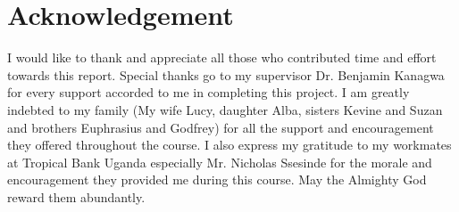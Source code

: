 \section*{Acknowledgement}
\noindent I would like to thank and appreciate all those who contributed time and effort towards this report. Special thanks go to my supervisor Dr. Benjamin Kanagwa for every support accorded to me in completing this project. 
\newline
I am greatly indebted to my family (My wife Lucy, daughter Alba, sisters Kevine and Suzan and brothers Euphrasius and Godfrey) for all the support and encouragement they offered throughout the course.
I also express my gratitude to my workmates at Tropical Bank Uganda especially Mr. Nicholas Ssesinde for the morale and encouragement they provided me during this course.
\newline
\noindent May the Almighty God reward them abundantly.
\newline
\newline
\pagestyle{plain}
\noindent
\newpage
